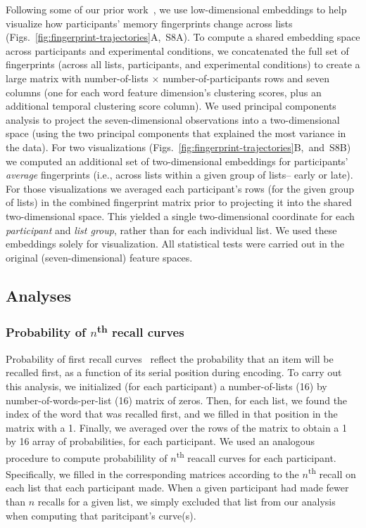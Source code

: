 \documentclass[11pt]{article}
\newcommand{\fingerprintTrajectoryRandom}{S8}
\begin{document}
Following some of our prior work~\citep{HeusEtal18a}, we use low-dimensional
embeddings to help visualize how participants' memory fingerprints change
across lists
(Figs.~\ref{fig:fingerprint-trajectories}A,~\fingerprintTrajectoryRandom A). To
compute a shared embedding space across participants and experimental
conditions, we concatenated the full set of fingerprints (across all lists,
participants, and experimental conditions) to create a large matrix with
number-of-lists $\times$ number-of-participants rows and seven columns (one for
each word feature dimension's clustering scores, plus an additional temporal
clustering score column). We used principal components analysis to project the
seven-dimensional observations into a two-dimensional space (using the two
principal components that explained the most variance in the data). For two
visualizations
(Figs.~\ref{fig:fingerprint-trajectories}B,~and~\fingerprintTrajectoryRandom B)
we computed an additional set of two-dimensional embeddings for participants'
\textit{average} fingerprints (i.e., across lists within a given group of
lists-- early or late). For those visualizations we averaged each participant's
rows (for the given group of lists) in the combined fingerprint matrix prior to
projecting it into the shared two-dimensional space. This yielded a single
two-dimensional coordinate for each \textit{participant} and \textit{list
group}, rather than for each individual list. We used these embeddings solely
for visualization. All statistical tests were carried out in the original
(seven-dimensional) feature spaces.

\subsection*{Analyses}

\subsubsection*{Probability of $n$\textsuperscript{th} recall curves}

Probability of first recall curves~\citep{AtkiShif68, PostPhil65, WelcBurn24}
reflect the probability that an item will be recalled first, as a function of
its serial position during encoding. To carry out this analysis, we initialized
(for each participant) a number-of-lists (16) by number-of-words-per-list (16)
matrix of zeros. Then, for each list, we found the index of the word that was
recalled first, and we filled in that position in the matrix with a 1. Finally,
we averaged over the rows of the matrix to obtain a 1 by 16 array of
probabilities, for each participant. We used an analogous procedure to compute
probabilility of $n$\textsuperscript{th} reacall curves for each participant.
Specifically, we filled in the corresponding matrices according to the
$n$\textsuperscript{th} recall on each list that each participant made. When a
given participant had made fewer than $n$ recalls for a given list, we simply
excluded that list from our analysis when computing that paritcipant's
curve(s).
\end{document}

